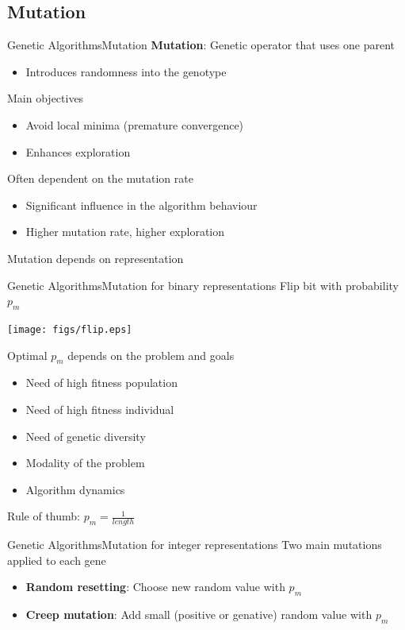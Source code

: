 \documentclass[10pt,compress]{beamer} %
\begin{document}
\subsection{Mutation}
\begin{frame}{Genetic Algorithms}{Mutation}
	\textbf{Mutation}: Genetic operator that uses one parent
	\begin{itemize}
		\item Introduces randomness into the genotype
  	\end{itemize}
	Main objectives
	\begin{itemize}
		\item Avoid local minima (premature convergence)
		\item Enhances exploration
	\end{itemize}
	Often dependent on the \alert{mutation rate}
	\begin{itemize}
		\item Significant influence in the algorithm behaviour
		\item Higher mutation rate, higher exploration
	\end{itemize}
	Mutation depends on representation
\end{frame}

\begin{frame}{Genetic Algorithms}{Mutation for binary representations}
	Flip bit with probability $p_m$
	\vspace{-0.7cm}
	\begin{center}
	\texttt{[image: figs/flip.eps]}
	\end{center}
	\vspace{-0.7cm}
	Optimal $p_m$ depends on the problem and goals
	\begin{itemize}
		\item Need of high fitness population
		\item Need of high fitness individual
		\item Need of genetic diversity
		\item Modality of the problem
		\item Algorithm dynamics
  	\end{itemize}
	Rule of thumb: $p_m = \frac{1}{length}$
\end{frame}

\begin{frame}{Genetic Algorithms}{Mutation for integer representations}
	Two main mutations applied to each gene
	\begin{itemize}
		\item \textbf{Random resetting}: Choose new random value with $p_m$
		\item \textbf{Creep mutation}: Add small (positive or genative) random value with $p_m$
	\end{itemize}
\end{frame}
\end{document}
